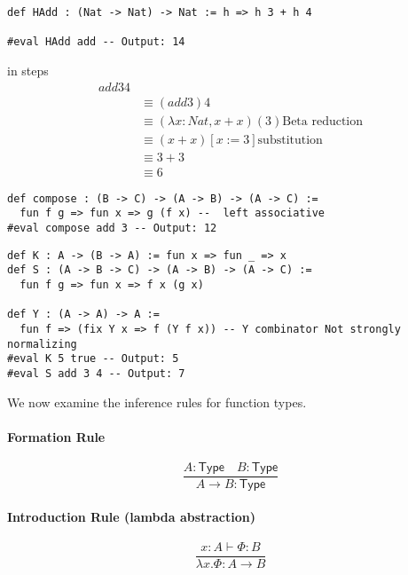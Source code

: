 \begin{example}
    \begin{lstlisting}[language=Lean]
def HAdd : (Nat -> Nat) -> Nat := h => h 3 + h 4

#eval HAdd add -- Output: 14

\end{lstlisting}
in steps
\begin{align}
  add 3 4  \\
  &\equiv (add 3) 4  \\
  &\equiv (\lambda x : Nat, x + x)(3) \text{Beta reduction} \\
  &\equiv (x + x) [x:= 3] \text{substitution}\\ 
  &\equiv 3 + 3 \\
  &\equiv 6
\end{align}
\end{example}
\begin{example}
    \begin{lstlisting}[language=Lean]
def compose : (B -> C) -> (A -> B) -> (A -> C) :=
  fun f g => fun x => g (f x) --  left associative 
#eval compose add 3 -- Output: 12
\end{lstlisting}
\end{example}
\begin{example}
    \begin{lstlisting}[language=Lean]
def K : A -> (B -> A) := fun x => fun _ => x  
def S : (A -> B -> C) -> (A -> B) -> (A -> C) :=
  fun f g => fun x => f x (g x)

def Y : (A -> A) -> A := 
  fun f => (fix Y x => f (Y f x)) -- Y combinator Not strongly normalizing
#eval K 5 true -- Output: 5 
#eval S add 3 4 -- Output: 7
\end{lstlisting}
\end{example}
We now examine the inference rules for function types.
\paragraph{Formation Rule}
\[
  \frac{A : \mathsf{Type} \quad B : \mathsf{Type}}{A \to B : \mathsf{Type}}
\]

\paragraph{Introduction Rule (lambda abstraction)}
\[
  \frac{x : A \vdash \Phi : B}{\lambda x.\Phi : A \to B}
\]

